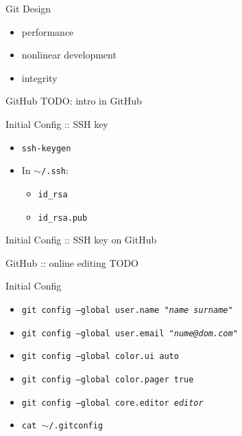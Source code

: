 \documentclass{beamer}
\begin{document}
\begin{frame}{Git Design}
  \begin{itemize}
    \item performance
    \item nonlinear development
    \item integrity
  \end{itemize}
\end{frame}

\begin{frame}{GitHub}
  TODO: intro in GitHub
\end{frame}

\begin{frame}{Initial Config :: SSH key}
  \begin{itemize}
    \item \texttt{ssh-keygen}
    \item In \texttt{$\sim$/.ssh}:
      \begin{itemize}
        \item \texttt{id\_rsa}
        \item \texttt{id\_rsa.pub}
      \end{itemize}
  \end{itemize}
\end{frame}

\begin{frame}{Initial Config :: SSH key on GitHub}
  \begin{center}
  \end{center}
\end{frame}

\begin{frame}{GitHub :: online editing}
  TODO
\end{frame}

\begin{frame}{Initial Config}
  \begin{itemize}
    \item \texttt{git config --global user.name "\textit{name surname}"}
    \item \texttt{git config --global user.email "\textit{nume@dom.com}"}
    \item \texttt{git config --global color.ui auto}
    \item \texttt{git config --global color.pager true}
    \item \texttt{git config --global core.editor \textit{editor}}
  \end{itemize}
  \pause
  \begin{itemize}
    \item \texttt{cat $\sim$/.gitconfig}
  \end{itemize}
\end{frame}
\end{document}
